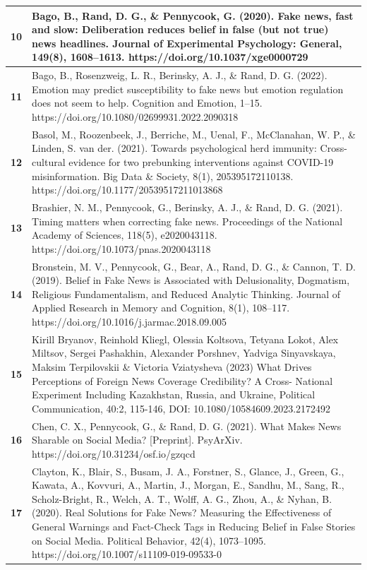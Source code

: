 \documentclass[
  doc,floatsintext]{apa6}
\begin{document}
\begin{longtable}[t]{>{}r||>{\raggedright\arraybackslash}p{30em}}
\hline
\textbf{10} & Bago, B., Rand, D. G., \& Pennycook, G. (2020). Fake news, fast and slow: Deliberation reduces belief in false (but not true) news headlines. Journal of Experimental Psychology: General, 149(8), 1608–1613. https://doi.org/10.1037/xge0000729\\
\hline
\textbf{11} & Bago, B., Rosenzweig, L. R., Berinsky, A. J., \& Rand, D. G. (2022). Emotion may predict susceptibility to fake news but emotion regulation does not seem to help. Cognition and Emotion, 1–15. https://doi.org/10.1080/02699931.2022.2090318\\
\hline
\textbf{12} & Basol, M., Roozenbeek, J., Berriche, M., Uenal, F., McClanahan, W. P., \& Linden, S. van der. (2021). Towards psychological herd immunity: Cross-cultural evidence for two prebunking interventions against COVID-19 misinformation. Big Data \& Society, 8(1), 205395172110138. https://doi.org/10.1177/20539517211013868\\
\hline
\textbf{13} & Brashier, N. M., Pennycook, G., Berinsky, A. J., \& Rand, D. G. (2021). Timing matters when correcting fake news. Proceedings of the National Academy of Sciences, 118(5), e2020043118. https://doi.org/10.1073/pnas.2020043118\\
\hline
\textbf{14} & Bronstein, M. V., Pennycook, G., Bear, A., Rand, D. G., \& Cannon, T. D. (2019). Belief in Fake News is Associated with Delusionality, Dogmatism, Religious Fundamentalism, and Reduced Analytic Thinking. Journal of Applied Research in Memory and Cognition, 8(1), 108–117. https://doi.org/10.1016/j.jarmac.2018.09.005\\
\hline
\textbf{15} & Kirill Bryanov, Reinhold Kliegl, Olessia Koltsova, Tetyana Lokot, Alex Miltsov, Sergei Pashakhin, Alexander Porshnev, Yadviga Sinyavskaya, Maksim Terpilovskii \& Victoria Vziatysheva (2023) What Drives Perceptions of Foreign News Coverage Credibility? A Cross- National Experiment Including Kazakhstan, Russia, and Ukraine, Political Communication, 40:2, 115-146, DOI: 10.1080/10584609.2023.2172492\\
\hline
\textbf{16} & Chen, C. X., Pennycook, G., \& Rand, D. G. (2021). What Makes News Sharable on Social Media? [Preprint]. PsyArXiv. https://doi.org/10.31234/osf.io/gzqcd\\
\hline
\textbf{17} & Clayton, K., Blair, S., Busam, J. A., Forstner, S., Glance, J., Green, G., Kawata, A., Kovvuri, A., Martin, J., Morgan, E., Sandhu, M., Sang, R., Scholz-Bright, R., Welch, A. T., Wolff, A. G., Zhou, A., \& Nyhan, B. (2020). Real Solutions for Fake News? Measuring the Effectiveness of General Warnings and Fact-Check Tags in Reducing Belief in False Stories on Social Media. Political Behavior, 42(4), 1073–1095. https://doi.org/10.1007/s11109-019-09533-0\\

\end{longtable}
\end{document}
